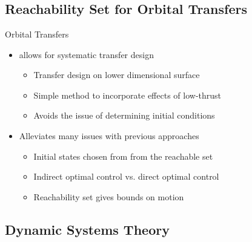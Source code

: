 
\section*{}
\subsection*{Reachability Set for Orbital Transfers}

\begin{frame}{Orbital Transfers} %
    \begin{itemize}
        \item {} allows for systematic transfer design
        \begin{itemize}
            \item Transfer design on lower dimensional \Poincare surface
            \item Simple method to incorporate effects of low-thrust 
            \item Avoids the issue of determining initial conditions
        \end{itemize}
    \pause
        \item Alleviates many issues with previous approaches
        \begin{itemize}
            \item Initial states chosen from from the reachable set
            \item Indirect optimal control vs. direct optimal control
            \item Reachability set gives bounds on motion
        \end{itemize}    
    \end{itemize}

\end{frame} %

\subsection*{Dynamic Systems Theory}


